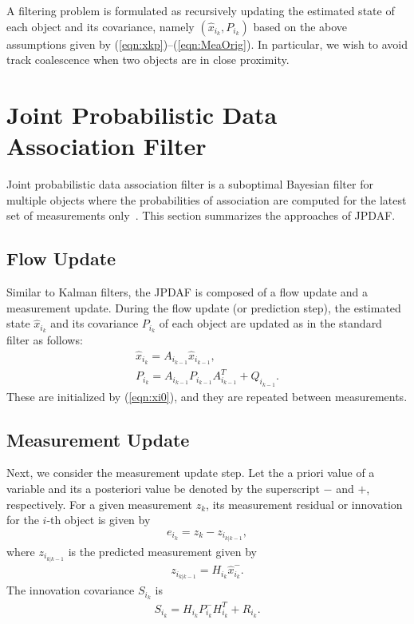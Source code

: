 \documentclass[letterpaper, 10pt, conference]{ieeeconf}
\newcommand{\refeqn}[1]{(\ref{eqn:#1})}
\begin{document}
A filtering problem is formulated as recursively updating the estimated state of each object and its covariance, namely $(\hat x_{i_k}, P_{i_k})$ based on the above assumptions given by \refeqn{xkp}--\refeqn{MeaOrig}. In particular, we wish to avoid track coalescence when two objects are in close proximity. 


\section{Joint Probabilistic Data Association Filter}
\label{JPDAF}

Joint probabilistic data association filter is a suboptimal Bayesian filter for multiple objects where the probabilities of association are computed for the latest set of measurements only~\cite{TrackDataAssoc}. This section summarizes the approaches of JPDAF. 

\subsection{Flow Update}
Similar to Kalman filters, the JPDAF is composed of a flow update and a measurement update. During the flow update (or prediction step), the estimated state $\hat x_{i_k}$ and its covariance $P_{i_k}$ of each object are updated as in the standard filter as follows:
\begin{gather}
\hat x_{i_{k}} = A_{i_{k-1}} \hat x_{i_{k-1}},\\
P_{i_{k}} = A_{i_{k-1}} P_{i_{k-1}} A_{i_{k-1}}^T + Q_{i_{k-1}}.
\end{gather}
These are initialized by \refeqn{xi0}, and they are repeated between measurements. 

\subsection{Measurement Update}

Next, we consider the measurement update step. Let  the a priori value of a variable and its a posteriori value be denoted by the superscript $-$ and $+$, respectively. For a given measurement $z_{k}$, its measurement residual or innovation for the $i$-th object is given by
\begin{align*}
e_{i_k} = z_k - z_{i_{k|k-1}},
\end{align*}
where $z_{i_{k|k-1}}$ is the predicted measurement given by
\begin{align}
z_{i_{k|k-1}} = H_{i_k} \hat x_{i_k}^-.
\end{align}
The innovation covariance $S_{i_k}$ is
\begin{align}
S_{i_k}=H_{i_k}P_{i_k}^{-}H_{i_k}^T+R_{i_k}.
\end{align}
\end{document}
